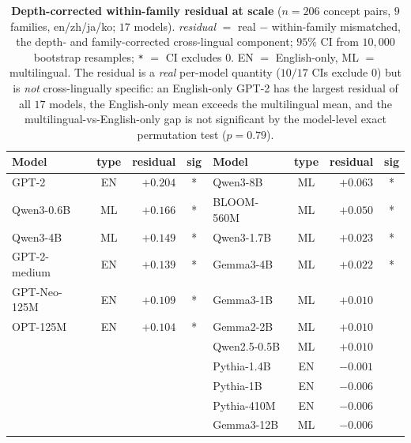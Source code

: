 \begin{table}[h]
\centering
\caption{\textbf{Depth-corrected within-family residual at scale} ($n=206$ concept pairs,
$9$ families, en/zh/ja/ko; $17$ models). \emph{residual} $=$ real $-$ within-family
mismatched, the depth- and family-corrected cross-lingual component; $95\%$ CI from $10{,}000$
bootstrap resamples; \texttt{*} $=$ CI excludes $0$. EN $=$ English-only, ML $=$
multilingual. The residual is a \emph{real} per-model quantity ($10/17$ CIs exclude $0$)
but is \emph{not} cross-lingually specific: an English-only GPT-2 has the largest residual
of all $17$ models, the English-only mean exceeds the multilingual mean, and the
multilingual-vs-English-only gap is not significant by the model-level exact permutation
test ($p=0.79$).}
\label{tab:residual_scaleup}
\small
\begin{tabular}{lcrc@{\hspace{1.5em}}lcrc}
\toprule
Model & type & residual & sig & Model & type & residual & sig \\
\midrule
GPT-2          & EN & $+0.204$ & * & Qwen3-8B      & ML & $+0.063$ & * \\
Qwen3-0.6B     & ML & $+0.166$ & * & BLOOM-560M    & ML & $+0.050$ & * \\
Qwen3-4B       & ML & $+0.149$ & * & Qwen3-1.7B    & ML & $+0.023$ & * \\
GPT-2-medium   & EN & $+0.139$ & * & Gemma3-4B     & ML & $+0.022$ & * \\
GPT-Neo-125M   & EN & $+0.109$ & * & Gemma3-1B     & ML & $+0.010$ & \\
OPT-125M       & EN & $+0.104$ & * & Gemma2-2B     & ML & $+0.010$ & \\
               &    &          &   & Qwen2.5-0.5B  & ML & $+0.010$ & \\
               &    &          &   & Pythia-1.4B   & EN & $-0.001$ & \\
               &    &          &   & Pythia-1B     & EN & $-0.006$ & \\
               &    &          &   & Pythia-410M   & EN & $-0.006$ & \\
               &    &          &   & Gemma3-12B    & ML & $-0.006$ & \\
\bottomrule
\end{tabular}


\end{table}
